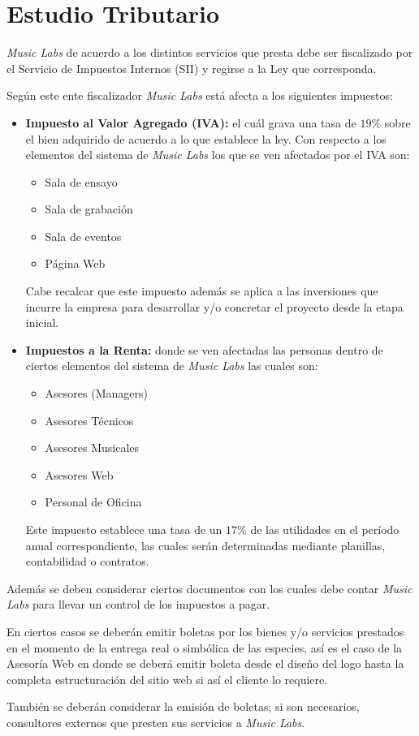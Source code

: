 \section{Estudio Tributario}

\emph{Music Labs} de acuerdo a los distintos servicios que presta
debe ser fiscalizado por el Servicio de Impuestos Internos (SII)
y regirse a la Ley que corresponda.

Según este ente fiscalizador \emph{Music Labs} está afecta a los siguientes impuestos:

\begin{itemize}

	\item {\bf Impuesto al Valor Agregado (IVA):}
		el cuál grava una tasa de $19\%$ sobre el bien adquirido de acuerdo a lo
		que establece la ley.
		Con respecto a los elementos del sistema de \emph{Music Labs} los que se ven afectados
		por el IVA son:
		
		\begin{itemize}
			\item Sala de ensayo
			\item Sala de grabación
			\item Sala de eventos
			\item Página Web
		\end{itemize}

		Cabe recalcar que este impuesto además se aplica a las inversiones que incurre
		la empresa para desarrollar y/o concretar el proyecto desde la etapa inicial.

	\item {\bf Impuestos a la Renta:} donde se ven afectadas las personas dentro de ciertos
		elementos del sistema de \emph{Music Labs} las cuales son:

		\begin{itemize}
			\item Asesores (Managers)
			\item Asesores Técnicos
			\item Asesores Musicales
			\item Asesores Web
			\item Personal de Oficina
		\end{itemize}
	
		Este impuesto establece una tasa de un $17\%$ de las utilidades en el período
		anual correspondiente, las cuales serán determinadas mediante planillas,
		contabilidad o contratos.

\end{itemize}

Además se deben considerar ciertos documentos con los cuales debe contar \emph{Music Labs}
para llevar un control de los impuestos a pagar.

En ciertos casos se deberán emitir boletas por los bienes y/o servicios prestados en el
momento de la entrega real o simbólica de las especies, así es el caso de la Asesoría
Web en donde se deberá emitir boleta desde el diseño del logo hasta la completa estructuración
del sitio web si así el cliente lo requiere.

También se deberán considerar la emisión de boletas; si son necesarios,
consultores externos que presten sus servicios a \emph{Music Labs}. 

